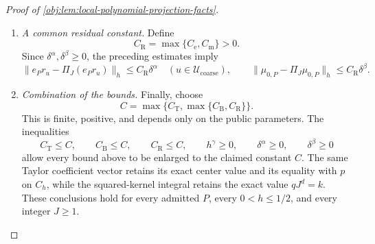 \begin{proof}[Proof of \cref{obj:lem:local-polynomial-projection-facts}]
\begin{enumerate}
Now set
\[
v^{(e,u,J)}_{\mathbf j,\kappa}
 =\frac{e_P(c_{\mathbf j})\mathsf A_{\mathbf j}[u,\kappa]}
        {\sqrt{J^d}},
\qquad
f_{e,u,J}(x)=
 \sum_{\mathbf j,\kappa}
 b_{\mathbf j,\kappa}(x)v^{(e,u,J)}_{\mathbf j,\kappa}.
\]
Disjointness of the cells and the tensor identity imply the everywhere
defined formula
\[
f_{e,u,J}(x)=
\begin{cases}
e_P(c_{\mathbf j})r_u(x),&x\in D_{\mathbf j},\\
0,&x\notin C_h.
\end{cases}
\]
Define
\[
E_{e,J}=L(\sqrt d)^\alpha4^d\delta^\alpha\ge0.
\]
For \(x\in D_{\mathbf j}\),
\[
\begin{aligned}
|f_{e,u}(x)-f_{e,u,J}(x)|
 &=|e_P(x)-e_P(c_{\mathbf j})|\,|r_u(x)|\\
 &\le L\|x-c_{\mathbf j}\|_2^\alpha4^d\\
 &\le L(\sqrt d\,\delta)^\alpha4^d
 =E_{e,J}.
\end{aligned}
\]
The probability normalization therefore gives
\[
\|f_{e,u}-f_{e,u,J}\|_h^2\le E_{e,J}^2.
\]
Applying the projection comparison from the preceding step to this
fine-basis expansion yields
\[
\|e_Pr_u-\Pi_J(e_Pr_u)\|_h
 \le\|f_{e,u}-f_{e,u,J}\|_h
 \le E_{e,J}.
\]
Thus the positive constant
\[
C_{\mathrm e}=L(\sqrt d)^\alpha4^d+1
\]
satisfies, uniformly in \(u\),
\[
\|e_Pr_u-\Pi_J(e_Pr_u)\|_h
 \le C_{\mathrm e}\delta^\alpha.
\]

\item \emph{A common residual constant.}
Define
\[
C_{\mathrm R}=\max\{C_{\mathrm e},C_{\mathrm m}\}>0.
\]
Since \(\delta^\alpha,\delta^\beta\ge0\), the preceding estimates imply
\[
\|e_Pr_u-\Pi_J(e_Pr_u)\|_h
 \le C_{\mathrm R}\delta^\alpha
 \quad(u\in\mathcal U_{\mathrm{coarse}}),
\qquad
\|\mu_{0,P}-\Pi_J\mu_{0,P}\|_h
 \le C_{\mathrm R}\delta^\beta.
\]

\item \emph{Combination of the bounds.}
Finally, choose
\[
C=\max\{C_{\mathrm T},\max\{C_{\mathrm B},C_{\mathrm R}\}\}.
\]
This is finite, positive, and depends only on the public parameters.
The inequalities
\[
C_{\mathrm T}\le C,\qquad
C_{\mathrm B}\le C,\qquad
C_{\mathrm R}\le C,
\qquad
h^\gamma\ge0,\qquad
\delta^\alpha\ge0,\qquad
\delta^\beta\ge0
\]
allow every bound above to be enlarged to the claimed constant \(C\).
The same Taylor coefficient vector retains its exact center value and
its equality with \(p\) on \(C_h\), while the squared-kernel integral
retains the exact value \(qJ^d=k\). These conclusions hold for every
admitted \(P\), every \(0<h\le1/2\), and every integer \(J\ge1\).
\end{enumerate}
\end{proof}
